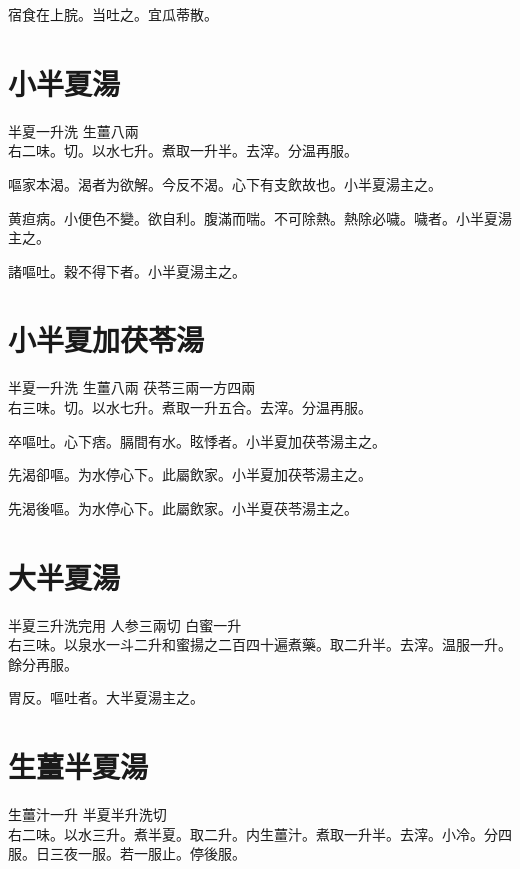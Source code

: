 宿食在上脘。当吐之。宜瓜蒂散。

\section{小半夏湯}

半夏{\scriptsize 一升洗} 生薑{\scriptsize 八兩}\\
右二味。切。以水七升。煮取一升半。去滓。分温再服。

嘔家本渴。渴者为欲解。今反不渴。心下有支飲故也。小半夏湯主之。

黄疸病。小便色不變。欲自利。腹滿而喘。不可除熱。熱除必噦。噦者。小半夏湯主之。

諸嘔吐。穀不得下者。小半夏湯主之。

\section{小半夏加茯苓湯}

半夏{\scriptsize 一升洗} 生薑{\scriptsize 八兩} 茯苓{\scriptsize 三兩一方四兩}\\
右三味。切。以水七升。煮取一升五合。去滓。分温再服。

卒嘔吐。心下痞。膈間有水。眩悸者。{\khaaitp 小}半夏加茯苓湯主之。

先渴卻嘔。为水停心下。此屬飲家。小半夏加茯苓湯主之。{\wuben}

先渴後嘔。为水停心下。此屬飲家。小半夏茯苓湯主之。{\dengben}

\section{大半夏湯}

半夏{\scriptsize 三升洗完用} 人参{\scriptsize 三兩切} 白蜜{\scriptsize 一升}\\
右三味。以泉水一斗二升和蜜揚之二百四十遍煮藥。取二升半。去滓。温服一升。餘分再服。

胃反。嘔吐者。大半夏湯主之。


\section{生薑半夏湯}

生薑汁{\scriptsize 一升} 半夏{\scriptsize 半升洗切}\\
右二味。以水三升。煮半夏。取二升。内生薑汁。煮取一升半。去滓。小冷。分四服。日三夜一服。若一服止。停後服。

